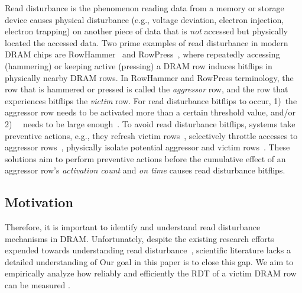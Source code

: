 Read disturbance is the phenomenon  reading data from a memory or
storage device causes physical disturbance (e.g., voltage deviation, electron
injection, electron trapping) on another piece of data that is \emph{not}
accessed but physically located  the accessed data. Two prime examples
of read disturbance in modern DRAM chips are RowHammer~\cite{kim2014flipping}
and RowPress~\cite{luo2023rowpress}, where repeatedly accessing (hammering) or
keeping active (pressing) a DRAM row induces bitflips in physically nearby DRAM
rows. In RowHammer and RowPress terminology, the row that is
hammered or pressed is called the \emph{aggressor} row, and the row that
experiences bitflips the \emph{victim} row. For read disturbance bitflips to
occur, 1)~the aggressor row needs to be activated more than a certain threshold
value, \gra{,} and/or
2)~~\cite{luo2023rowpress} needs to be large
enough~\cite{kim2020revisiting, orosa2021deeper, yaglikci2022understanding,
luo2023rowpress}. To avoid read disturbance bitflips, systems take preventive
actions, e.g., they refresh victim
rows~, selectively throttle accesses to
aggressor rows~\cite{yaglikci2021blockhammer, greenfield2012throttling}, 
physically isolate potential aggressor and victim rows~\cite{hassan2019crow,
konoth2018zebram, saileshwar2022randomized, saxena2022aqua, wi2023shadow,
woo2023scalable}. These solutions aim to perform preventive actions before the
cumulative effect of an aggressor row's \emph{activation count} and \emph{on
time} causes read disturbance bitflips.

\subsection{Motivation}

 Therefore, it is important
to identify and understand read disturbance mechanisms in DRAM. Unfortunately,
despite the existing research efforts expended towards understanding read
disturbance~\understandingRowHammerAllCitations{}, scientific literature lacks a
detailed understanding of   Our goal in this
paper is to close this gap. We aim to empirically analyze how reliably and
efficiently the RDT of a victim DRAM row can be measured .

